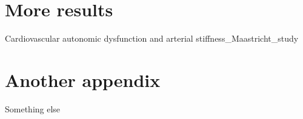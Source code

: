 \documentclass[
  a4paper,
  headsepline=true,
  open=any]{scrbook}
\begin{document}
\cleardoublepage
{}
{}
\appendix

\hypertarget{sec-more-results}{%
\chapter{More results}\label{sec-more-results}}

Cardiovascular autonomic dysfunction and arterial
stiffness\_Maastricht\_study



\hypertarget{another-appendix}{%
\chapter{Another appendix}\label{another-appendix}}

Something else


\backmatter
\end{document}
